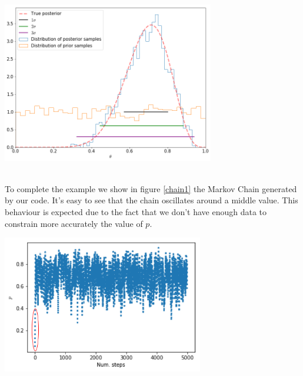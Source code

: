 \documentclass[onecolumn,           %
               showpacs,            %
               preprintnumbers,     %
               aps,                 %
               letterpaper,             %
               superscriptaddress,      %
               nofootinbib,         %
               tightenlines,        %
               floats,floatfix      %
               ,usenatbib,
               ]{revtex4-1}
\begin{document}
\begin{minipage}{\textwidth}
\centering

\includegraphics[height=7cm]{Figures/posterior.png}
\label{posteriord}
\end{minipage}\\

\noindent To complete the example we show in figure \ref{chain1} the Markov Chain generated by our code. It's easy to see that the chain oscillates around a middle value. This behaviour is expected due to the fact that we don't have enough data to constrain more accurately the value of $p$.

\begin{minipage}{\textwidth}
\centering
\includegraphics[height=6cm]{Figures/chain1.png}
\label{chain1}
\end{minipage}\\ $ $ \\
\end{document}
